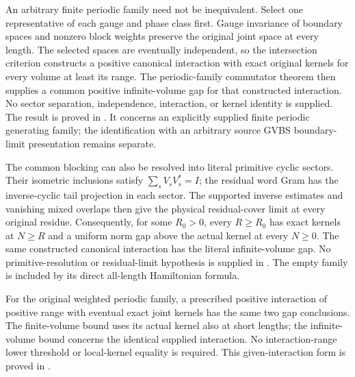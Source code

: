 \documentclass{article}
\begin{document}
An arbitrary finite periodic family need not be inequivalent. Select one
representative of each gauge and phase class first. Gauge invariance of
boundary spaces and nonzero block weights preserve the original joint space
at every length. The selected spaces are eventually independent, so the
intersection criterion constructs a positive canonical interaction with
exact original kernels for every volume at least its range. The
periodic-family commutator theorem then supplies a common positive
infinite-volume gap for that constructed interaction. No sector separation,
independence, interaction, or kernel identity is supplied. The result is
proved in
.
It concerns an explicitly supplied finite periodic generating family; the
identification with an arbitrary source GVBS boundary-limit presentation
remains separate.


The common blocking can also be resolved into literal primitive cyclic
sectors. Their isometric inclusions satisfy $\sum_sV_sV_s^*=I$; the residual
word Gram has the inverse-cyclic tail projection in each sector. The
supported inverse estimates and vanishing mixed overlaps then give the
physical residual-cover limit at every original residue. Consequently, for
some $R_0>0$, every $R\geq R_0$ has exact kernels at $N\geq R$ and a
uniform norm gap above the actual kernel at every $N\geq0$. The same
constructed canonical interaction has the literal infinite-volume gap.
No primitive-resolution or residual-limit hypothesis is supplied in
.
The empty family is included by its direct all-length Hamiltonian formula.


For the original weighted periodic family, a prescribed positive interaction
of positive range with eventual exact joint kernels has the same two gap
conclusions. The finite-volume bound uses its actual kernel also at short
lengths; the infinite-volume bound concerns the identical supplied
interaction. No interaction-range lower threshold or local-kernel equality
is required. This given-interaction form is proved in
.



\end{document}
